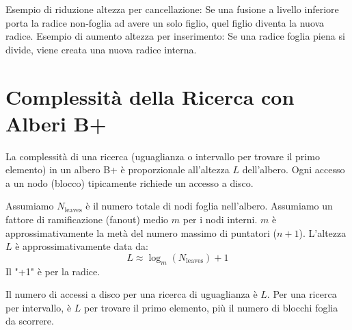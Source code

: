 Esempio di riduzione altezza per cancellazione: Se una fusione a livello inferiore porta la radice non-foglia ad avere un solo figlio, quel figlio diventa la nuova radice.
Esempio di aumento altezza per inserimento: Se una radice foglia piena si divide, viene creata una nuova radice interna.\section{Complessità della Ricerca con Alberi B+}
La complessità di una ricerca (uguaglianza o intervallo per trovare il primo elemento) in un albero B+ è proporzionale all'altezza $L$ dell'albero. Ogni accesso a un nodo (blocco) tipicamente richiede un accesso a disco.

Assumiamo $N_{\text{leaves}}$ è il numero totale di nodi foglia nell'albero.
Assumiamo un fattore di ramificazione (fanout) medio $m$ per i nodi interni. $m$ è approssimativamente la metà del numero massimo di puntatori ($n+1$).
L'altezza $L$ è approssimativamente data da:
\[ L \approx \log_{m}(N_{\text{leaves}}) + 1 \]
Il "+1" è per la radice.

Il numero di accessi a disco per una ricerca di uguaglianza è $L$. Per una ricerca per intervallo, è $L$ per trovare il primo elemento, più il numero di blocchi foglia da scorrere.

